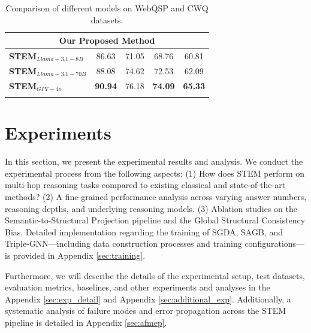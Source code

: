 \documentclass[11pt]{article}
\begin{document}
\begin{table}[t]
{\begin{tabular}{l|cc|cc}
\multicolumn{5}{c}{\textbf{Our Proposed Method}} \\ 
\hline
\textbf{STEM$_{Llama-3.1-8B}$}             & 86.63 & 71.05 & 68.76 & 60.81 \\ \hdashline
\textbf{STEM$_{Llama-3.1-70B}$}    & 88.08 & 74.62 & 72.53 & 62.09 \\ \hdashline
\textbf{STEM$_{GPT-4o}$}          & \textbf{90.94} & 76.18 & \textbf{74.09} & \textbf{65.33} \\ \hdashline
\hline
\bottomrule
\end{tabular}
}
\caption{Comparison of different models on WebQSP and CWQ datasets.}
\label{tab:main_results}
\end{table}

\section{Experiments}

In this section, we present the experimental results and analysis. We conduct the experimental process from the following aspects: (1) How does STEM perform on multi-hop reasoning tasks compared to existing classical and state-of-the-art methods? (2) A fine-grained performance analysis across varying answer numbers, reasoning depths, and underlying reasoning models. (3) Ablation studies on the Semantic-to-Structural Projection pipeline and the Global Structural Consistency Bias. Detailed implementation regarding the training of SGDA, SAGB, and Triple-GNN—including data construction processes and training configurations—is provided in Appendix \ref{sec:training}.

Furthermore, we will describe the details of the experimental setup, test datasets, evaluation metrics, baselines, and other experiments and analyses in the Appendix \ref{sec:exp_detail} and Appendix \ref{sec:additional_exp}. Additionally, a systematic analysis of failure modes and error propagation across the STEM pipeline is detailed in Appendix \ref{sec:afmep}. 
\end{document}
